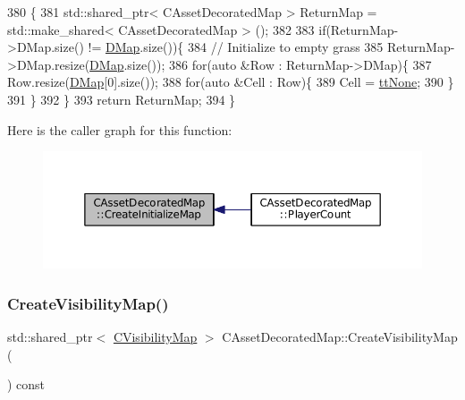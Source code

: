 \begin{DoxyCode}
380                                                                                  \{
381     std::shared\_ptr< CAssetDecoratedMap > ReturnMap = std::make\_shared< CAssetDecoratedMap > ();
382     
383     \textcolor{keywordflow}{if}(ReturnMap->DMap.size() != \hyperlink{classCTerrainMap_a80d154ce478948b10473534a7bca13f6}{DMap}.size())\{
384         \textcolor{comment}{// Initialize to empty grass}
385         ReturnMap->DMap.resize(\hyperlink{classCTerrainMap_a80d154ce478948b10473534a7bca13f6}{DMap}.size());
386         \textcolor{keywordflow}{for}(\textcolor{keyword}{auto} &Row : ReturnMap->DMap)\{
387             Row.resize(\hyperlink{classCTerrainMap_a80d154ce478948b10473534a7bca13f6}{DMap}[0].size());
388             \textcolor{keywordflow}{for}(\textcolor{keyword}{auto} &Cell : Row)\{
389                 Cell = \hyperlink{classCTerrainMap_aff2ab991e237269941416dd79d8871d4a481e779132fb16414d17870bd6229eb5}{ttNone};
390             \}
391         \}
392     \}
393     \textcolor{keywordflow}{return} ReturnMap;
394 \}
\end{DoxyCode}
Here is the caller graph for this function\+:\nopagebreak
\begin{figure}[H]
\begin{center}
\leavevmode
\includegraphics[width=350pt]{classCAssetDecoratedMap_a2807be3f5fe7858f476b80fef228fa03_icgraph}
\end{center}
\end{figure}
\hypertarget{classCAssetDecoratedMap_aa05e81ec37b4217053e8de050e47dba7}{}\label{classCAssetDecoratedMap_aa05e81ec37b4217053e8de050e47dba7} 
\subsubsection{\texorpdfstring{Create\+Visibility\+Map()}{CreateVisibilityMap()}}
{\footnotesize\ttfamily std\+::shared\+\_\+ptr$<$ \hyperlink{classCVisibilityMap}{C\+Visibility\+Map} $>$ C\+Asset\+Decorated\+Map\+::\+Create\+Visibility\+Map (\begin{DoxyParamCaption}{ }\end{DoxyParamCaption}) const}



